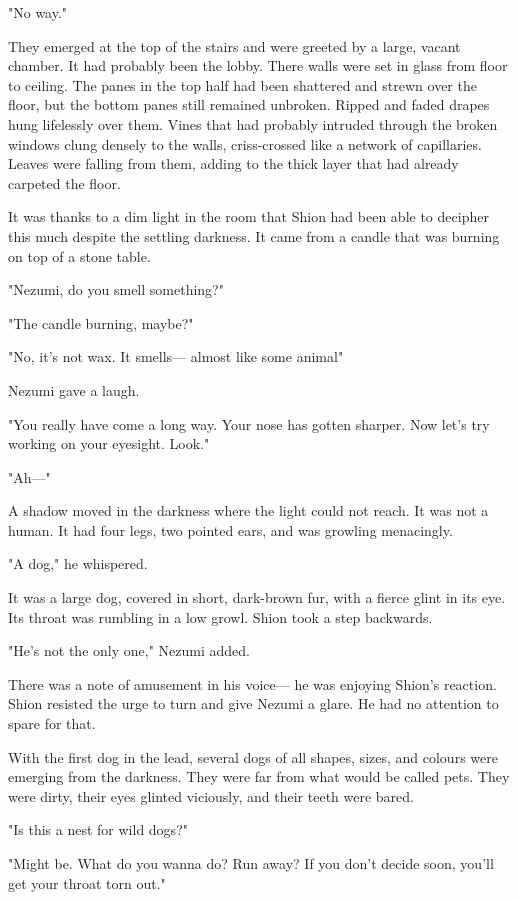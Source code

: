 "No way."

They emerged at the top of the stairs and were greeted by a large,
vacant chamber. It had probably been the lobby. There walls were set in
glass from floor to ceiling. The panes in the top half had been
shattered and strewn over the floor, but the bottom panes still remained
unbroken. Ripped and faded drapes hung lifelessly over them. Vines that
had probably intruded through the broken windows clung densely to the
walls, criss-crossed like a network of capillaries. Leaves were falling
from them, adding to the thick layer that had already carpeted the
floor.

It was thanks to a dim light in the room that Shion had been able to
decipher this much despite the settling darkness. It came from a candle
that was burning on top of a stone table.

"Nezumi, do you smell something?"

"The candle burning, maybe?"

"No, it's not wax. It smells--- almost like some animal\el "

Nezumi gave a laugh.

"You really have come a long way. Your nose has gotten sharper. Now
let's try working on your eyesight. Look."

"Ah---"

A shadow moved in the darkness where the light could not reach. It was
not a human. It had four legs, two pointed ears, and was growling
menacingly.

"A dog," he whispered.

It was a large dog, covered in short, dark-brown fur, with a fierce
glint in its eye. Its throat was rumbling in a low growl. Shion took a
step backwards.

"He's not the only one," Nezumi added.

There was a note of amusement in his voice--- he was enjoying Shion's
reaction. Shion resisted the urge to turn and give Nezumi a glare. He
had no attention to spare for that.

With the first dog in the lead, several dogs of all shapes, sizes, and
colours were emerging from the darkness. They were far from what would
be called pets. They were dirty, their eyes glinted viciously, and their
teeth were bared.

"Is this a nest for wild dogs?"

"Might be. What do you wanna do? Run away? If you don't decide soon,
you'll get your throat torn out."

